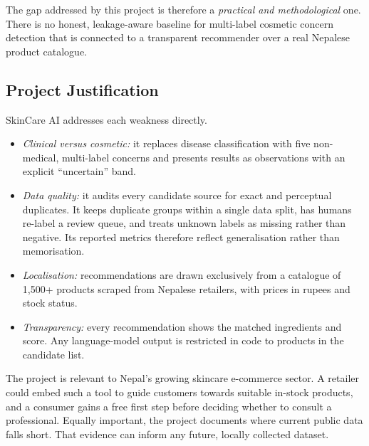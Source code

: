 The gap addressed by this project is therefore a \emph{practical and methodological} one. There is no honest, leakage-aware baseline for multi-label cosmetic concern detection that is connected to a transparent recommender over a real Nepalese product catalogue.

\subsection{Project Justification}
\label{sec:justification}

SkinCare AI addresses each weakness directly.
\begin{itemize}
  \item \emph{Clinical versus cosmetic:} it replaces disease classification with five non-medical, multi-label concerns and presents results as observations with an explicit ``uncertain'' band.
  \item \emph{Data quality:} it audits every candidate source for exact and perceptual duplicates. It keeps duplicate groups within a single data split, has humans re-label a review queue, and treats unknown labels as missing rather than negative. Its reported metrics therefore reflect generalisation rather than memorisation.
  \item \emph{Localisation:} recommendations are drawn exclusively from a catalogue of 1,500+ products scraped from Nepalese retailers, with prices in rupees and stock status.
  \item \emph{Transparency:} every recommendation shows the matched ingredients and score. Any language-model output is restricted in code to products in the candidate list.
\end{itemize}

The project is relevant to Nepal's growing skincare e-commerce sector. A retailer could embed such a tool to guide customers towards suitable in-stock products, and a consumer gains a free first step before deciding whether to consult a professional. Equally important, the project documents where current public data falls short. That evidence can inform any future, locally collected dataset.
